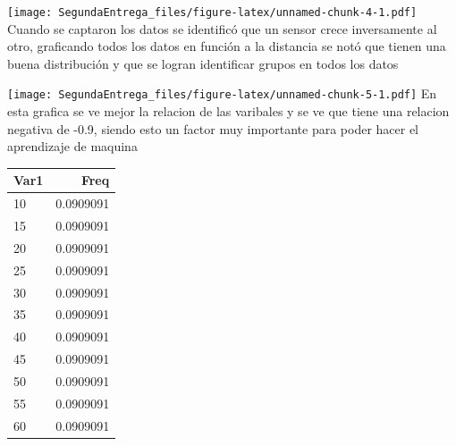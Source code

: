 \documentclass[
]{article}
\newenvironment{Shaded}{\begin{snugshade}}{\end{snugshade}}
\newcommand{\AttributeTok}[1]{\textcolor[rgb]{0.77,0.63,0.00}{#1}}
\newcommand{\DecValTok}[1]{\textcolor[rgb]{0.00,0.00,0.81}{#1}}
\newcommand{\FunctionTok}[1]{\textcolor[rgb]{0.00,0.00,0.00}{#1}}
\newcommand{\NormalTok}[1]{#1}
\newcommand{\SpecialCharTok}[1]{\textcolor[rgb]{0.00,0.00,0.00}{#1}}
\newcommand{\StringTok}[1]{\textcolor[rgb]{0.31,0.60,0.02}{#1}}
\begin{document}
\texttt{[image: SegundaEntrega\_files/figure-latex/unnamed-chunk-4-1.pdf]}
Cuando se captaron los datos se identificó que un sensor crece
inversamente al otro, graficando todos los datos en función a la
distancia se notó que tienen una buena distribución y que se logran
identificar grupos en todos los datos

\begin{Shaded}
\end{Shaded}

\texttt{[image: SegundaEntrega\_files/figure-latex/unnamed-chunk-5-1.pdf]}
En esta grafica se ve mejor la relacion de las varibales y se ve que
tiene una relacion negativa de -0.9, siendo esto un factor muy
importante para poder hacer el aprendizaje de maquina

\begin{Shaded}
\end{Shaded}

\begin{longtable}[]{@{}lr@{}}
\toprule()
Var1 & Freq \\
\midrule()
\endhead
10 & 0.0909091 \\
15 & 0.0909091 \\
20 & 0.0909091 \\
25 & 0.0909091 \\
30 & 0.0909091 \\
35 & 0.0909091 \\
40 & 0.0909091 \\
45 & 0.0909091 \\
50 & 0.0909091 \\
55 & 0.0909091 \\
60 & 0.0909091 \\
\bottomrule()
\end{longtable}
\end{document}
